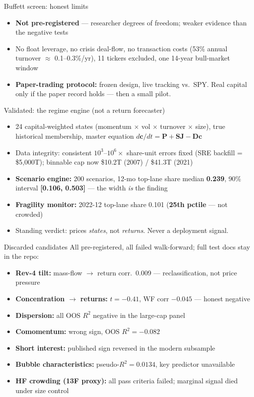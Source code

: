 \documentclass[10pt]{beamer}
\begin{document}
\begin{frame}{Buffett screen: honest limits}
\begin{itemize}
\item \textbf{Not pre-registered} --- researcher degrees of freedom; weaker evidence than the negative tests
\item No float leverage, no crisis deal-flow, no transaction costs (53\% annual turnover $\approx$ 0.1--0.3\%/yr), 11 tickers excluded, one 14-year bull-market window
\item \textbf{Paper-trading protocol:} frozen design, live tracking vs.\ SPY. Real capital only if the paper record holds --- then a small pilot.
\end{itemize}
\end{frame}

\begin{frame}{Validated: the regime engine (not a return forecaster)}
\begin{itemize}
\item 24 capital-weighted states (momentum $\times$ vol $\times$ turnover $\times$ size), true historical membership, master equation $d\mathbf{c}/dt = \mathbf{P} + \mathbf{S}\mathbf{J} - \mathbf{D}\mathbf{c}$
\item Data integrity: consistent $10^3$--$10^6\times$ share-unit errors fixed (SRE backfill = \$5{,}000T); binnable cap now \$10.2T (2007) / \$41.3T (2021)
\item \textbf{Scenario engine:} 200 scenarios, 12-mo top-lane share median \textbf{0.239}, 90\% interval \textbf{[0.106, 0.503]} --- the width \emph{is} the finding
\item \textbf{Fragility monitor:} 2022-12 top-lane share 0.101 (\textbf{25th pctile} --- not crowded)
\item Standing verdict: prices \emph{states}, not \emph{returns}. Never a deployment signal.
\end{itemize}
\end{frame}

\begin{frame}{Discarded candidates}
All pre-registered, all failed walk-forward; full test docs stay in the repo:
\begin{itemize}
\item \textbf{Rev-4 tilt:} mass-flow $\to$ return corr.\ 0.009 --- reclassification, not price pressure
\item \textbf{Concentration $\to$ returns:} $t=-0.41$, WF corr $-0.045$ --- honest negative
\item \textbf{Dispersion:} all OOS $R^2$ negative in the large-cap panel
\item \textbf{Comomentum:} wrong sign, OOS $R^2=-0.082$
\item \textbf{Short interest:} published sign reversed in the modern subsample
\item \textbf{Bubble characteristics:} pseudo-$R^2=0.0134$, key predictor unavailable
\item \textbf{HF crowding (13F proxy):} all pass criteria failed; marginal signal died under size control
\end{itemize}
\end{frame}
\end{document}
